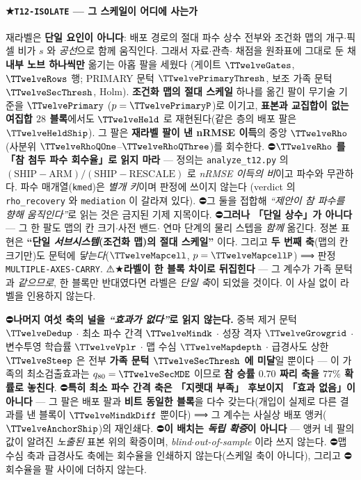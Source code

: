 \documentclass[11pt]{report}
\numberwithin{equation}{chapter}
\numberwithin{figure}{chapter}
\numberwithin{table}{chapter}
\begin{document}
\paragraph{★\texttt{T12-ISOLATE} --- 그 스케일이 어디에 사는가}
재라벨은 \textbf{단일 요인이 아니다}: 배포 경로의 절대 파수 상수 전부와 조건화 맵의
개구$\cdot$픽셀 비가 $s$ 와 \emph{공선}으로 함께 움직인다. 그래서 자료$\cdot$관측$\cdot$
채점을 원좌표에 그대로 둔 채 \textbf{내부 노브 하나씩만} 옮기는 아홉 팔을 세웠다
(게이트 $\TTwelveGates$, $\TTwelveRows$ 행; PRIMARY 문턱 $\TTwelvePrimaryThresh$,
보조 가족 문턱 $\TTwelveSecThresh$, Holm).
\textbf{조건화 맵의 절대 스케일} 하나를 옮긴 팔이 무기술 기준을 $\TTwelvePrimary$
($p = \TTwelvePrimaryP$)로 이기고, \textbf{표본과 교집합이 없는 여집합 $28$ 블록}에서도
$\TTwelveHeld$ 로 재현된다(같은 층의 배포 팔은 $\TTwelveHeldShip$). 그 팔은
\textbf{재라벨 팔이 낸 nRMSE 이득}의 중앙 $\TTwelveRho$(사분위
$\TTwelveRhoQOne$--$\TTwelveRhoQThree$)를 회수한다.
⛔\textbf{$\TTwelveRho$ 를 「참 첨두 파수 회수율」로 읽지 마라} --- 정의는
\texttt{analyze\_t12.py} 의
$(\mathrm{SHIP}-\mathrm{ARM})/(\mathrm{SHIP}-\mathrm{RESCALE})$ 로 \emph{nRMSE 이득의 비}이고
파수와 무관하다. 파수 매개열(\texttt{kmed})은 \emph{별개 키}이며 판정에 쓰이지 않는다
(verdict 의 \texttt{rho\_recovery} 와 \texttt{mediation} 이 갈라져 있다).
⛔그 둘을 접합해 \emph{``제안이 참 파수를 향해 움직인다''}로 읽는 것은 금지된 기제 지목이다.
⛔\textbf{그러나 「단일 상수」가 아니다} --- 그 한 팔도 맵의 칸 크기$\cdot$사전 밴드$\cdot$
연마 단계의 물리 스텝을 \emph{함께} 옮긴다. 정본 표현은
\textbf{``단일 \emph{서브시스템}(조건화 맵)의 절대 스케일''} 이다.
그리고 \textbf{두 번째 축}(맵의 칸 크기만)도 문턱에 \emph{닿는다}($\TTwelveMapcell$,
$p = \TTwelveMapcellP$) ⟹ 판정 \texttt{MULTIPLE-AXES-CARRY}.
⚠★\textbf{라벨이 한 블록 차이로 뒤집힌다} --- 그 계수가 가족 문턱과 \emph{같으므로},
한 블록만 반대였다면 라벨은 \emph{단일 축}이 되었을 것이다. 이 사실 없이 라벨을 인용하지 않는다.

⛔\textbf{나머지 여섯 축의 널을 \emph{``효과가 없다''}로 읽지 않는다.} 중복 제거 문턱
$\TTwelveDedup$ $\cdot$ 최소 파수 간격 $\TTwelveMindk$ $\cdot$ 성장 격자
$\TTwelveGrowgrid$ $\cdot$ 변수투영 학습률 $\TTwelveVplr$ $\cdot$ 맵 수심
$\TTwelveMapdepth$ $\cdot$ 급경사도 상한 $\TTwelveSteep$ 은 전부
\textbf{가족 문턱 $\TTwelveSecThresh$ 에 미달}일 뿐이다 --- 이 가족의 최소검출효과는
$q_{80} = \TTwelveSecMDE$ 이므로 \textbf{참 승률 $0.70$ 짜리 축을 $77\%$ 확률로 놓친다}.
⛔\textbf{특히 최소 파수 간격 축은 「지렛대 부족」 후보이지 「효과 없음」이 아니다} ---
그 팔은 배포 팔과 \textbf{비트 동일한 블록}을 다수 갖는다(개입이 실제로 다른 결과를 낸
블록이 $\TTwelveMindkDiff$ 뿐이다) ⟹ 그 계수는 사실상 배포 앵커($\TTwelveAnchorShip$)의
재인쇄다. ⛔\textbf{이 배치는 \emph{독립 확증}이 아니다} --- 앵커 네 팔의 값이 알려진
\emph{노출된} 표본 위의 확증이며, \emph{blind}$\cdot$\emph{out-of-sample} 이라 쓰지 않는다.
⛔맵 수심 축과 급경사도 축에는 회수율을 인쇄하지 않는다(스케일 축이 아니다), 그리고
⛔회수율을 팔 사이에 더하지 않는다.
\end{document}
